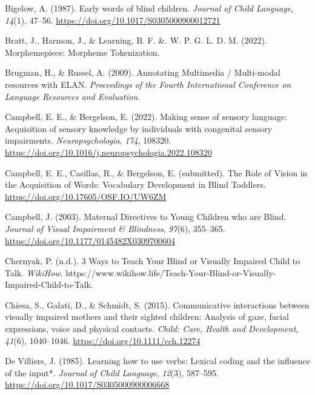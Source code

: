 \documentclass[
  man,floatsintext]{apa6}
\newlength{\cslhangindent}
\newlength{\cslentryspacingunit} %
\newenvironment{CSLReferences}[2] %
 {%
  \setlength{\parindent}{0pt}
  \ifodd #1
  \let\oldpar\par
  \def\par{\hangindent=\cslhangindent\oldpar}
  \fi
  \setlength{\parskip}{#2\cslentryspacingunit}
 }%
 {}
\begin{document}
\begin{CSLReferences}{1}{0}
\leavevmode{}%
Bigelow, A. (1987). Early words of blind children. \emph{Journal of Child Language}, \emph{14}(1), 47--56. \url{https://doi.org/10.1017/S0305000900012721}

\leavevmode{}%
Bratt, J., Harmon, J., \& Learning, B. F. \&. W. P. G. L. D. M. (2022). Morphemepiece: {Morpheme Tokenization}.

\leavevmode{}%
Brugman, H., \& Russel, A. (2009). Annotating {Multimedia} / {Multi-modal} resources with {ELAN}. \emph{Proceedings of the Fourth International Conference on Language Resources and Evaluation}.

\leavevmode{}%
Campbell, E. E., \& Bergelson, E. (2022). Making sense of sensory language: {Acquisition} of sensory knowledge by individuals with congenital sensory impairments. \emph{Neuropsychologia}, \emph{174}, 108320. \url{https://doi.org/10.1016/j.neuropsychologia.2022.108320}

\leavevmode{}%
Campbell, E. E., Casillas, R., \& Bergelson, E. (submitted). The {Role} of {Vision} in the {Acquisition} of {Words}: {Vocabulary Development} in {Blind Toddlers}. \url{https://doi.org/10.17605/OSF.IO/UW6ZM}

\leavevmode{}%
Campbell, J. (2003). Maternal {Directives} to {Young Children} who are {Blind}. \emph{Journal of Visual Impairment \& Blindness}, \emph{97}(6), 355--365. \url{https://doi.org/10.1177/0145482X0309700604}

\leavevmode{}%
Chernyak, P. (n.d.). 3 {Ways} to {Teach Your Blind} or {Visually Impaired Child} to {Talk}. \emph{WikiHow}. https://www.wikihow.life/Teach-Your-Blind-or-Visually-Impaired-Child-to-Talk.

\leavevmode{}%
Chiesa, S., Galati, D., \& Schmidt, S. (2015). Communicative interactions between visually impaired mothers and their sighted children: Analysis of gaze, facial expressions, voice and physical contacts. \emph{Child: Care, Health and Development}, \emph{41}(6), 1040--1046. \url{https://doi.org/10.1111/cch.12274}

\leavevmode{}%
De Villiers, J. (1985). Learning how to use verbs: Lexical coding and the influence of the input*. \emph{Journal of Child Language}, \emph{12}(3), 587--595. \url{https://doi.org/10.1017/S0305000900006668}


\end{CSLReferences}
\end{document}
